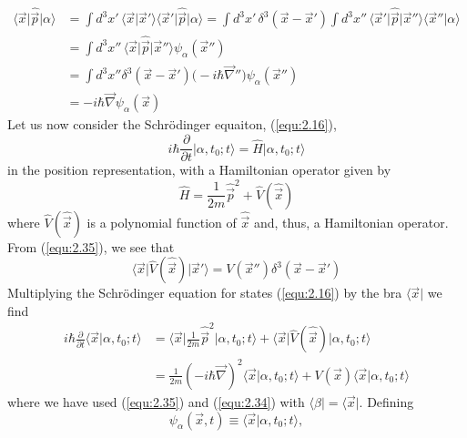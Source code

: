 \begin{align}
  \langle \vec{x}\vert \hat{\vec{p}}\vert \alpha\rangle  &=
  \int d^3 x' \, \langle \vec{x}\vert \vec{x}'\rangle 
  \langle \vec{x}'\vert \hat{\vec{p}}\vert \alpha\rangle  = 
  \int d^3 x' \, \delta^3(\vec{x}-\vec{x}')
  \int d^3 x'' \, \langle \vec{x}'\vert \hat{\vec{p}}\vert \vec{x}''\rangle 
  \langle \vec{x}''\vert \alpha\rangle  \nonumber\\
  &=
  \int d^3 x'' \, \langle \vec{x}\vert \hat{\vec{p}}\vert \vec{x}''\rangle 
  \psi_{\alpha}(\vec{x}'')\nonumber\\
  &=
  \int d^3 x'' \delta^3(\vec{x}-\vec{x}') \bigl(-i\hbar
  \vec{\nabla}''\bigr) \psi_{\alpha}(\vec{x}'')\nonumber\\ 
  &=
  -i\hbar \vec{\nabla} \psi_{\alpha}(\vec{x})
  \label{equ:2.35}
\end{align}
Let us now consider the Schrödinger equaiton,
(\ref{equ:2.16}),
$$
  i\hbar \frac{\partial}{\partial t} \vert \alpha,t_0;t\rangle  =
  \hat{H}\vert \alpha,t_0;t\rangle 
$$
in the position representation, with a Hamiltonian operator
given by
\begin{equation}
  \hat{H} = \frac{1}{2m} \hat{\vec{p}}^2 +
  \hat{V}(\hat{\vec{x}})
  \label{equ:2.36}
\end{equation}
where $\hat{V}(\hat{\vec{x}})$ is a polynomial function of
$\hat{\vec{x}}$ and, thus, a Hamiltonian operator. From
(\ref{equ:2.35}), we see that
\begin{equation}
  \langle \vec{x}\vert \hat{V}(\hat{\vec{x}})\vert \vec{x}'\rangle  =
  V(\vec{x}'')\delta^3(\vec{x}-\vec{x}')
  \label{equ:2.37}
\end{equation}
Multiplying the Schrödinger equation for states
(\ref{equ:2.16}) by the bra $\langle \vec{x}\vert $ we find
\begin{align}
  i\hbar \frac{\partial}{\partial t} \langle \vec{x}\vert \alpha,t_0;t\rangle 
  &=
  \langle \vec{x}\vert \frac{1}{2m} \hat{\vec{p}}^2 \vert \alpha,t_0;t\rangle  +
  \langle \vec{x}\vert \hat{V}(\hat{\vec{x}})\vert \alpha,t_0;t\rangle \nonumber\\
  &=
  \frac{1}{2m}(-i\hbar \vec{\nabla})^2
  \langle \vec{x}\vert \alpha,t_0;t\rangle  + V(\vec{x}) \langle \vec{x}\vert \alpha,t_0;t\rangle 
  \label{equ:2.38}
\end{align}
where we have used (\ref{equ:2.35}) and (\ref{equ:2.34})
with $\langle \beta\vert  = \langle \vec{x}\vert $. Defining
\begin{equation}
  \psi_{\alpha} (\vec{x},t) \equiv \langle \vec{x}\vert \alpha,t_0;t\rangle ,
  \label{equ:2.39}
\end{equation}

